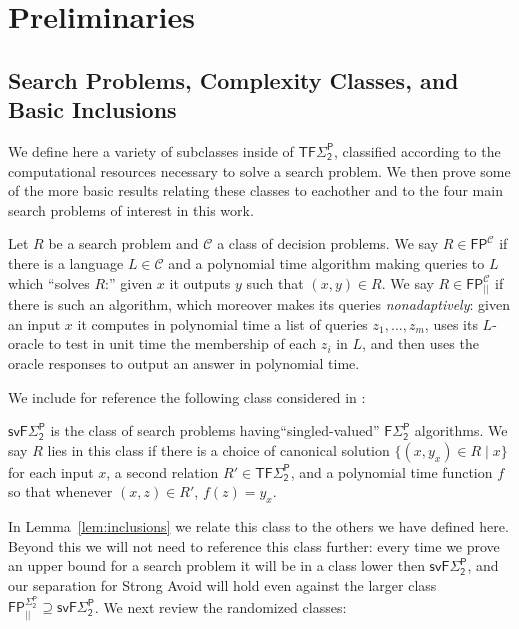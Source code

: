 \section{Preliminaries}
\label{sec:prelims}
\subsection{Search Problems, Complexity Classes, and Basic Inclusions}
\label{sec:totalsearch}
We define here a variety of subclasses inside of $\mathsf{TF\Sigma_2^P}$, classified according to the computational resources necessary to solve a search problem. We then prove some of the more basic results relating these classes to eachother and to the four main search problems of interest in this work.

\begin{definition}
Let $R$ be a search problem and $\mathcal{C}$ a class of decision problems. We say $R \in \mathsf{FP}^\mathcal{C}$ if there is a language $L \in \mathcal{C}$ and a polynomial time algorithm making queries to $L$ which ``solves $R$:'' given $x$ it outputs $y$ such that $(x,y) \in R$. We say $R \in \mathsf{FP}_{||}^{\mathcal{C}}$ if there is such an algorithm, which moreover makes its queries \emph{nonadaptively}: given an input $x$ it computes in polynomial time a list of queries $z_1,\ldots,z_m$, uses its $L$-oracle to test in unit time the membership of each $z_i$ in $L$, and then uses the oracle responses to output an answer in polynomial time.
\end{definition}

We include for reference the following class considered in \cite{Li,CHR}:
\begin{definition}
$\mathsf{svF\Sigma_2^P}$ is the class of search problems having``singled-valued'' $\mathsf{F\Sigma_2^P}$ algorithms. We say $R$ lies in this class if there is a choice of canonical solution $\{(x,y_x)\in R \mid x\}$ for each input $x$, a second relation $R' \in \mathsf{TF\Sigma_2^P}$, and a polynomial time function $f$ so that whenever $(x,z) \in R'$, $f(z)=y_x$.
\end{definition}
In Lemma~\ref{lem:inclusions} we relate this class to the others we have defined here. Beyond this we will not need to reference this class further: every time we prove an upper bound for a search problem it will be in a class lower then $\mathsf{svF\Sigma_2^P}$, and our separation for {\sc Strong Avoid} will hold even against the larger class $\mathsf{FP_{||}^{\Sigma_2^P}} \supseteq \mathsf{svF\Sigma_2^P}$. We next review the randomized classes:

